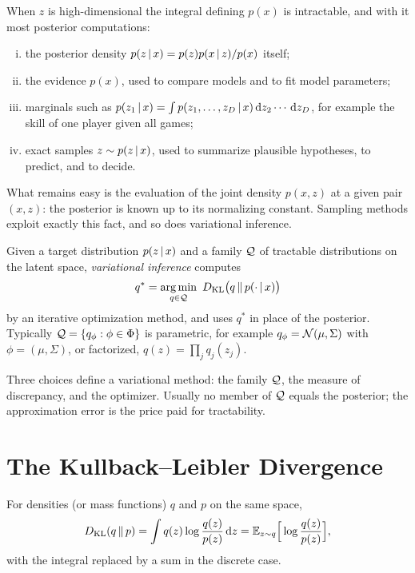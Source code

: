 When $z$ is high-dimensional the integral defining $p(x)$ is intractable, and with it most posterior computations:
\begin{enumerate}[(i)]
  \item the posterior density $p(z\,|\, x)=p(z)p(x\,|\, z)/p(x)$ itself;
  \item the evidence $p(x)$, used to compare models and to fit model parameters;
  \item marginals such as $p(z_1\,|\, x)=\int p(z_1,\dots,z_D\,|\, x)\,\mathrm{d} z_2\cdots\,\mathrm{d} z_D$, for example the skill of one player given all games;
  \item exact samples $z\sim p(z\,|\, x)$, used to summarize plausible hypotheses, to predict, and to decide.
\end{enumerate}
What remains easy is the evaluation of the joint density $p(x,z)$ at a given pair $(x,z)$: the posterior is known up to its normalizing constant. Sampling methods exploit exactly this fact, and so does variational inference.

\begin{definition}\label{def:vi}
Given a target distribution $p(z\,|\, x)$ and a family $\mathcal{Q}$ of tractable distributions on the latent space, \emph{variational inference} computes
\[
q^*=\argmin_{q\in\cQ}\ \KL\big(q\,\|\,p(\cdot\given x)\big)
\]
by an iterative optimization method, and uses $q^*$ in place of the posterior. Typically $\mathcal{Q}=\{q_\phi:\phi\in\Phi\}$ is parametric, for example $q_\phi=\mathcal{N}(\mu,\Sigma)$ with $\phi=(\mu,\Sigma)$, or factorized, $q(z)=\prod_jq_j(z_j)$.
\end{definition}

Three choices define a variational method: the family $\mathcal{Q}$, the measure of discrepancy, and the optimizer. Usually no member of $\mathcal{Q}$ equals the posterior; the approximation error is the price paid for tractability.

\section{The Kullback--Leibler Divergence}\label{sec:kl}

\begin{definition}[KL Divergence]\label{def:kl}
For densities (or mass functions) $q$ and $p$ on the same space,
\[
D_{\mathrm{KL}}(q\,\|\,p)=\int q(z)\log\frac{q(z)}{p(z)}\,\mathrm{d} z=\mathbb{E}_{z\sim q}\Big[\log\frac{q(z)}{p(z)}\Big],
\]
with the integral replaced by a sum in the discrete case.
\end{definition}

